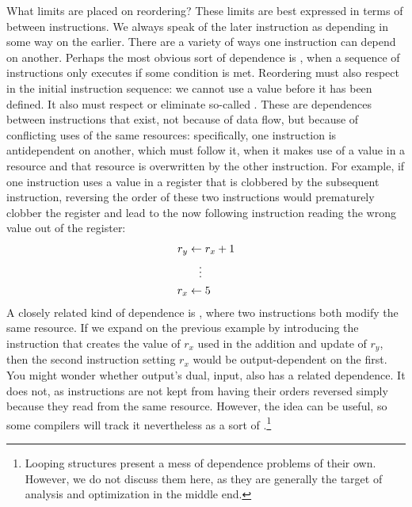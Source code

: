 What limits are placed on reordering? These limits are best expressed in terms of  between instructions. We always speak of the later instruction as depending in some way on the earlier. There are a variety of ways one instruction can depend on another. Perhaps the most obvious sort of dependence is , when a sequence of instructions only executes if some condition is met. Reordering must also respect  in the initial instruction sequence: we cannot use a value before it has been defined. It also must respect or eliminate so-called . These are dependences between instructions that exist, not because of data flow, but because of conflicting uses of the same resources: specifically, one instruction is antidependent on another, which must follow it, when it makes use of a value in a resource and that resource is overwritten by the other instruction. For example, if one instruction uses a value in a register that is clobbered by the subsequent instruction, reversing the order of these two instructions would prematurely clobber the register and lead to the now following instruction reading the wrong value out of the register: %
\begin{align*}
r_{y} &\gets r_{x} + 1\\
&\hphantom{\gets}\vdots\\
r_{x} &\gets 5
\end{align*}
A closely related kind of dependence is , where two instructions both modify the same resource. If we expand on the previous example by introducing the instruction that creates the value of $r_{x}$ %
used in the addition and update of $r_{y}$, then the second instruction setting $r_{x}$ would be output-dependent on the first. You might wonder whether output's dual, input, also has a related dependence. It does not, as instructions are not kept from having their orders reversed simply because they read from the same resource. However, the idea can be useful, so some compilers will track it nevertheless as a sort of .\footnote{Looping structures present a mess of dependence problems of their own. However, we do not discuss them here, as they are generally the target of analysis and optimization in the middle end.}

